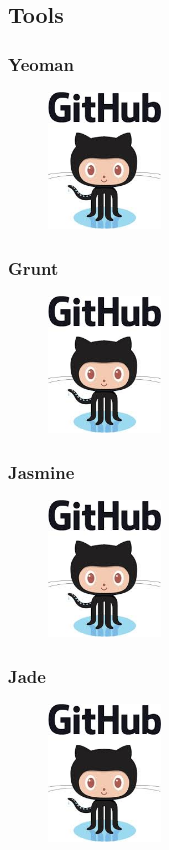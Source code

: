 \subsection{Tools}
\subsubsection{Yeoman}
\begin{figure}
\includegraphics[width=3cm]{img/zf2/github-logo.png}
\end{figure} 

\subsubsection{Grunt}
\begin{figure}
\includegraphics[width=3cm]{img/zf2/github-logo.png}
\end{figure} 


\subsubsection{Jasmine}
\begin{figure}
\includegraphics[width=3cm]{img/zf2/github-logo.png}
\end{figure} 


\subsubsection{Jade}
\begin{figure}
\includegraphics[width=3cm]{img/zf2/github-logo.png}
\end{figure} 


